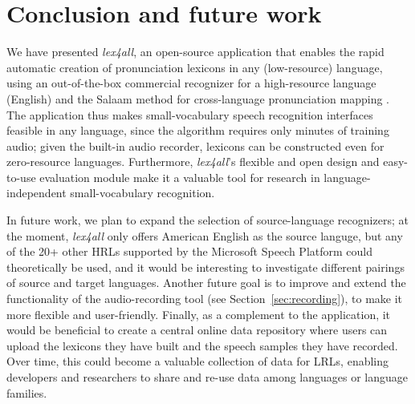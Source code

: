 \documentclass[11pt]{article}
\begin{document}
\section{Conclusion and future work}
\label{sec:future}

We have presented \textit{lex4all}, an open-source application that enables the rapid automatic creation of pronunciation lexicons in any (low-resource) language, using an out-of-the-box commercial recognizer \cite{mspsdk} for a high-resource language (English) and the Salaam method for cross-language pronunciation mapping \cite{Qiao10,Chan12}. The application thus makes small-vocabulary speech recognition interfaces feasible in any language, since the algorithm requires only minutes of training audio; given the built-in audio recorder, lexicons can be constructed even for zero-resource languages. 
Furthermore, \textit{lex4all}'s flexible and open design and easy-to-use evaluation module
make it a valuable tool for
research in language-independent small-vocabulary recognition.

In future work, we plan 
to expand the selection of source-language recognizers; at the moment, \textit{lex4all} only offers American English as the source languge, but any of the 20+ other HRLs supported by the Microsoft Speech Platform could theoretically be used, and it would be interesting to investigate different pairings of source and target languages. Another future goal is to improve and extend the functionality of the audio-recording tool (see Section~\ref{sec:recording}), 
to make it more flexible and user-friendly.
Finally, as a complement to the application, it would be beneficial to 
create a central online data repository where users can 
upload the lexicons they have built and the speech samples they have recorded. %
Over time, this could become a valuable collection of data for LRLs, enabling developers and researchers to share and re-use data among languages or language families.
\end{document}
